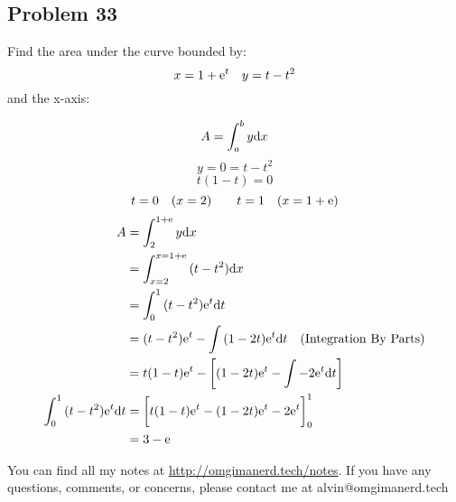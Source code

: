 \documentclass{math}
\begin{document}
\subsection*{Problem 33}
Find the area under the curve bounded by:
\[ x = 1+\mathrm{e}^{t} \quad y = t-t^{2} \]
and the x-axis:
\begin{center}
\end{center}
\[ A = \int_{a}^{b}{y\mathrm{d}{x}} \]
\[ y = 0 = t-t^{2} \]
\[ t(1-t) = 0 \]
\[ t = 0 \quad (x = 2) \quad \quad t = 1 \quad (x=1+\mathrm{e}) \]
\begin{align*}
  A &= \int_{2}^{1+\mathrm{e}}{y\mathrm{d}{x}} \\
  &= \int_{x=2}^{x=1+\mathrm{e}}{(t-t^{2})\mathrm{d}{x}} \\
  &= \int_{0}^{1}{(t-t^{2})\mathrm{e}^{t}\mathrm{d}{t}} \\
  &= (t-t^{2})\mathrm{e}^{t}-\int{(1-2t)\mathrm{e}^{t}\mathrm{d}{t}}
    \quad\mathrm{(Integration\ By\ Parts)} \\
  &= t(1-t)\mathrm{e}^{t}-\bigg[(1-2t)\mathrm{e}^{t}-\int{-2\mathrm{e}^{t}\mathrm{d}{t}}\bigg] \\
  \int_{0}^{1}{(t-t^{2})\mathrm{e}^{t}\mathrm{d}{t}} &=
    \bigg[t(1-t)\mathrm{e}^{t}-(1-2t)\mathrm{e}^{t}-2\mathrm{e}^{t}\bigg]_{0}^{1} \\
  &= 3-\mathrm{e}
\end{align*}

\begin{center}
  You can find all my notes at \url{http://omgimanerd.tech/notes}. If you have
  any questions, comments, or concerns, please contact me at
  alvin@omgimanerd.tech
\end{center}
\end{document}
